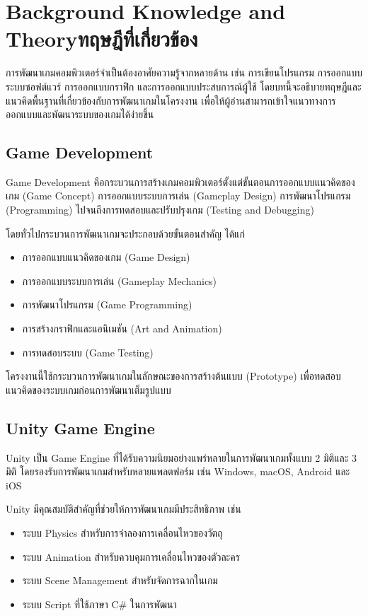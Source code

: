 \chapter{\ifenglish Background Knowledge and Theory\else ทฤษฎีที่เกี่ยวข้อง\fi}

การพัฒนาเกมคอมพิวเตอร์จำเป็นต้องอาศัยความรู้จากหลายด้าน เช่น การเขียนโปรแกรม การออกแบบระบบซอฟต์แวร์ การออกแบบกราฟิก และการออกแบบประสบการณ์ผู้ใช้ โดยบทนี้จะอธิบายทฤษฎีและแนวคิดพื้นฐานที่เกี่ยวข้องกับการพัฒนาเกมในโครงงาน เพื่อให้ผู้อ่านสามารถเข้าใจแนวทางการออกแบบและพัฒนาระบบของเกมได้ง่ายขึ้น

\section{Game Development}

Game Development คือกระบวนการสร้างเกมคอมพิวเตอร์ตั้งแต่ขั้นตอนการออกแบบแนวคิดของเกม (Game Concept) การออกแบบระบบการเล่น (Gameplay Design) การพัฒนาโปรแกรม (Programming) ไปจนถึงการทดสอบและปรับปรุงเกม (Testing and Debugging)

โดยทั่วไปกระบวนการพัฒนาเกมจะประกอบด้วยขั้นตอนสำคัญ ได้แก่

\begin{itemize}
\item การออกแบบแนวคิดของเกม (Game Design)
\item การออกแบบระบบการเล่น (Gameplay Mechanics)
\item การพัฒนาโปรแกรม (Game Programming)
\item การสร้างกราฟิกและแอนิเมชัน (Art and Animation)
\item การทดสอบระบบ (Game Testing)
\end{itemize}

โครงงานนี้ใช้กระบวนการพัฒนาเกมในลักษณะของการสร้างต้นแบบ (Prototype) เพื่อทดสอบแนวคิดของระบบเกมก่อนการพัฒนาเต็มรูปแบบ

\section{Unity Game Engine}

Unity เป็น Game Engine ที่ได้รับความนิยมอย่างแพร่หลายในการพัฒนาเกมทั้งแบบ 2 มิติและ 3 มิติ โดยรองรับการพัฒนาเกมสำหรับหลายแพลตฟอร์ม เช่น Windows, macOS, Android และ iOS

Unity มีคุณสมบัติสำคัญที่ช่วยให้การพัฒนาเกมมีประสิทธิภาพ เช่น

\begin{itemize}
\item ระบบ Physics สำหรับการจำลองการเคลื่อนไหวของวัตถุ
\item ระบบ Animation สำหรับควบคุมการเคลื่อนไหวของตัวละคร
\item ระบบ Scene Management สำหรับจัดการฉากในเกม
\item ระบบ Script ที่ใช้ภาษา C\# ในการพัฒนา
\end{itemize}

